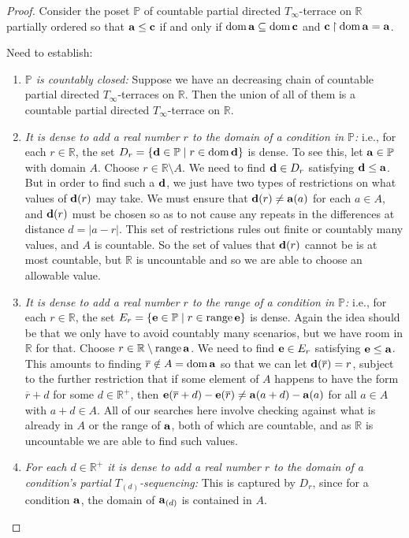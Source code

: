 \documentclass{amsart}
\theoremstyle{definition}
\theoremstyle{remark}
\renewcommand{\P}{\mathbb{P}}
\newcommand{\R}{\mathbb{R}}
\renewcommand{\c}{\mathfrak{c}}
\DeclareMathOperator{\ran}{range}
\DeclareMathOperator{\dom}{dom}
\newcommand{\st}{\; | \;}
\newcommand{\set}[2]{\left\{#1\st #2 \right\}}
\newcommand{\rest}{\mathbin{\upharpoonright}}
\renewcommand{\a}{\textup{\textbf{a}}}
\renewcommand{\c}{\textup{\textbf{c}}}
\renewcommand{\d}{\textup{\textbf{d}}}
\newcommand{\e}{\textup{\textbf{e}}}
\renewcommand{\r}{\overline r}
\begin{document}
\begin{proof}
Consider the poset $\P$ of countable partial directed $T_\infty$-terrace on $\R$ partially ordered so that $\a \leq \c$ if and only if $\dom \a \subseteq \dom \c$ and $\c \rest \dom \a = \a$.

Need to establish: \begin{enumerate}
	\item \emph{$\P$ is countably closed:} Suppose we have an decreasing chain of countable partial directed $T_\infty$-terraces on $\R$. Then the union of all of them is a countable partial directed $T_\infty$-terrace on $\R$.
	\item \emph{It is dense to add a real number $r$ to the domain of a condition in $\P$:} i.e., for each $r \in \R$, the set $D_r=\set{\d \in \P}{r \in \dom \d }$ is dense. To see this, let $\a \in \P$ with domain $A$. Choose $r \in \R \setminus A$. We need to find $\d \in D_r$ satisfying $\d \leq \a$. But in order to find such a $\d$, we just have two types of restrictions on what values of $\d(r)$ may take. We must ensure that $\d(r) \neq \a(a)$ for each $a \in A$, and $\d(r)$ must be chosen so as to not cause any repeats in the differences at distance $d = |a-r|$. This set of restrictions rules out finite or countably many values, and $A$ is countable. So the set of values that $\d(r)$ cannot be is at most countable, but $\R$ is uncountable and so we are able to choose an allowable value.
	\item \emph{It is dense to add a real number $r$ to the range of a condition in $\P$:} i.e., for each $r \in \R$, the set $E_r=\set{\e \in \P}{r \in \ran \e }$ is dense. Again the idea should be that we only have to avoid countably many scenarios, but we have room in $\R$ for that. Choose $r \in \R \setminus \ran \a$. We need to find $\e \in E_r$ satisfying $\e \leq \a$. This amounts to finding $\r \notin A = \dom \a$ so that we can let $\d(\overline r)=r$, subject to the further restriction that if some element of $A$ happens to have the form $\r +d$ for some $d \in \R^+$, then $\e(\r+d)-\e(\r) \neq \a(a+d)-\a(a)$ for all $a\in A$ with $a+d \in A$. All of our searches here involve checking against what is already in $A$ or the range of $\a$, both of which are countable, and as $\R$ is uncountable we are able to find such values.
	\item \label{item:StepFunctionDomainDense} \emph{For each $d \in \R^+$ it is dense to add a real number $r$ to the domain of a condition's partial $T_{(d)}$-sequencing:} This is captured by $D_r$, since for a condition $\a$, the domain of $\a_{(d)}$ is contained in $A$.

\end{enumerate}
\end{proof}
\end{document}
